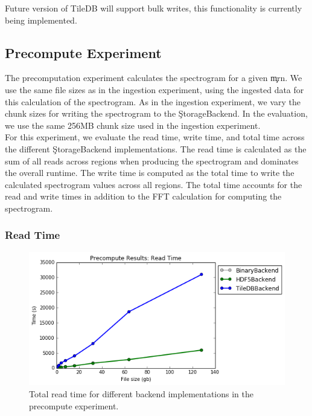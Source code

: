 Future version of TileDB will support bulk writes, this functionality is
currently being implemented.

\subsection{Precompute Experiment}\label{storage-ch:precompute-exp}

The precomputation experiment calculates the spectrogram for a given \c{mrn}.
We use the same file sizes as in the ingestion experiment, using the ingested
data for this calculation of the spectrogram.  As in the ingestion experiment,
we vary the chunk sizes for writing the spectrogram to the \c{StorageBackend}.
In the evaluation, we use the same 256MB chunk size used in the ingestion
experiment. \\

For this experiment, we evaluate the read time, write time, and total time
across the different \c{StorageBackend} implementations. The read time is
calculated as the sum of all reads across regions when producing the
spectrogram and dominates the overall runtime. The write time is
computed as the total time to write the calculated spectrogram values across all
regions. The total time accounts for the read and write times in addition to
the FFT calculation for computing the spectrogram. \\

\subsubsection{Read Time}

\begin{figure}[h]
\begin{center}
\includegraphics[scale=0.75]{./img/precompute-exp-read-time.png}
\caption{Total read time for different backend implementations in the
  precompute experiment.}
\label{fig:precompute-exp-read-time}
\end{center}
\end{figure}

